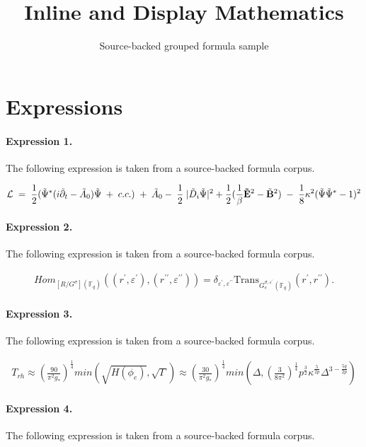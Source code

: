 \documentclass[11pt]{article}
\title{Inline and Display Mathematics}
\author{Source-backed grouped formula sample}
\date{}
\begin{document}
\maketitle
\section{Expressions}
\paragraph{Expression 1.} The following expression is taken from a source-backed formula corpus.

\begin{align*}{\cal L}\;=\;{1\over 2}( \tilde \Psi\sp\ast (i\tilde \partial_t - \tilde A_0)\tilde \Psi \;+\; c.c.)\;+\;\tilde A_0 -\; {1\over 2} \;|\tilde D_i\tilde \Psi|^2 + {1\over 2} ({1\over \beta} {\bf \tilde E}\sp2 - \tilde {\bf B}\sp2 )\;-\; {1\over 8} \kappa\sp2 (\tilde \Psi \tilde \Psi\sp\ast-1)\sp2\end{align*}

\paragraph{Expression 2.} The following expression is taken from a source-backed formula corpus.

\begin{align*}Hom_{[R\slash G^{\sigma}](\mathbb{F}_q)} \left( (r^{\prime}, \varepsilon^{\prime}) , (r^{\prime \prime}, \varepsilon^{\prime\prime}) \right) = \delta_{\varepsilon^{\prime},\varepsilon^{\prime\prime}} \text{Trans}_{G_e^{\sigma, \varepsilon^{\prime}}(\mathbb{F}_q)}(r^{\prime}, r^{\prime \prime}).\end{align*}

\paragraph{Expression 3.} The following expression is taken from a source-backed formula corpus.

\begin{align*}T_{rh} \approx \left( \frac{90}{\pi^2g_{*}}\right)^{\frac{1}{4}} min\left(\sqrt{H(\phi_e)},\sqrt{\Gamma}\right)\approx \left(\frac{30}{\pi^2g_{*}}\right)^{\frac{1}{4}}min\left(\Delta,\left( \frac{3}{8\pi^2}\right)^{\frac{1}{4}}p^{\frac{3}{2}}\kappa^{\frac{5}{2p}}\Delta^{3-\frac{5q}{2p}}\right)\end{align*}

\paragraph{Expression 4.} The following expression is taken from a source-backed formula corpus.
\end{document}
